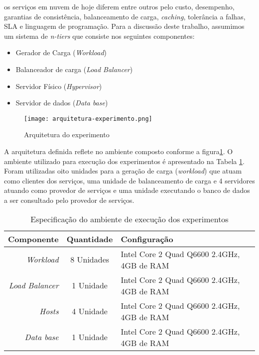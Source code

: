 \cite{Binnig2009} os serviços em nuvem de hoje diferem entre outros pelo custo, desempenho, garantias de consistência, balanceamento de carga, \textit{caching}, tolerância a falhas, SLA e linguagem de programação. Para a discussão deste trabalho, assumimos um sistema de \textit{n-tiers} que consiste nos seguintes componentes:

\begin{itemize}
	\item Gerador de Carga (\textit{Workload})
	\item Balanceador de carga (\textit{Load Balancer})
	\item Servidor Físico (\textit{Hypervisor})
	\item Servidor de dados (\textit{Data base})
\end{itemize}



\begin{figure}[!htb]
	\centering
	\texttt{[image: arquitetura-experimento.png]}
	\caption{Arquitetura do experimento}
	\label{fig:arquitetura-experimento}
	\fautor
\end{figure}

A arquitetura definida reflete no ambiente composto conforme a figura\ref{fig:arquitetura-experimento}. O ambiente utilizado para execução dos experimentos é apresentado na Tabela \ref{tab:configuracao_maquinas}.
Foram utilizadas oito unidades para a geração de carga (\textit{workload}) que atuam como clientes dos serviços, uma unidade de balanceamento de carga e 4 servidores atuando como provedor de serviços e uma unidade executando o banco de dados a ser consultado pelo provedor de serviços.

\begin{table}[htb]
	\centering
	\caption{Especificação do ambiente de execução dos experimentos}
	\label{tab:configuracao_maquinas}
	\begin{tabularx}{\textwidth}{|r|c|X|} \hline\hline
		\textbf{Componente}    & \textbf{Quantidade} & \textbf{Configuração} \\ \hline
		\textit{Workload}      & 8 Unidades          & Intel Core 2 Quad Q6600 2.4GHz, 4GB de RAM \\
		\textit{Load Balancer} & 1 Unidade           & Intel Core 2 Quad Q6600 2.4GHz, 4GB de RAM \\
		\textit{Hosts}         & 4 Unidade           & Intel Core 2 Quad Q6600 2.4GHz, 4GB de RAM \\
		\textit{Data base}     & 1 Unidade           & Intel Core 2 Quad Q6600 2.4GHz, 4GB de RAM \\
		\hline
	\end{tabularx}
	\fdadospesquisa
\end{table}


